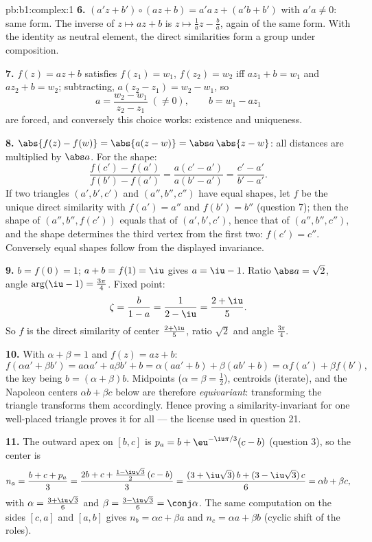 \begin{solution}{pb:b1:complex:1}
\textbf{6.} $(a'z + b') \circ (az + b) = a'a\,z + (a'b + b')$ with
$a'a \neq 0$: same form. The inverse of $z \mapsto az + b$ is $z
\mapsto \frac1a z - \frac ba$, again of the same form. With the
identity  as neutral element, the direct similarities form a
group under composition.

\textbf{7.} $f(z) = az + b$ satisfies $f(z_1) = w_1$, $f(z_2) =
w_2$ iff $a z_1 + b = w_1$ and $a z_2 + b = w_2$; subtracting,
$a(z_2 - z_1) = w_2 - w_1$, so
\[
a = \frac{w_2 - w_1}{z_2 - z_1} \;(\neq 0), \qquad
b = w_1 - a z_1
\]
are forced, and conversely this choice works: existence and
uniqueness.

\textbf{8.} $\abs{f(z) - f(w)} = \abs{a(z - w)} = \abs a\,\abs{z -
w}$: all distances are multiplied by $\abs a$. For the shape:
\[
\frac{f(c') - f(a')}{f(b') - f(a')} = \frac{a(c' -
a')}{a(b' - a')} = \frac{c' - a'}{b' - a'} .
\]
If two triangles $(a', b', c')$ and $(a'', b'', c'')$ have equal
shapes, let $f$ be the unique direct similarity with $f(a') = a''$
and $f(b') = b''$ (question 7); then the shape of $(a'', b'',
f(c'))$ equals that of $(a', b', c')$, hence that of $(a'', b'',
c'')$, and the shape determines the third vertex from the first
two: $f(c') = c''$. Conversely equal shapes follow from the
displayed invariance.

\textbf{9.} $b = f(0) = 1$; $a + b = f(1) = \iu$ gives $a = \iu -
1$. Ratio $\abs a = \sqrt2$, angle $\arg(\iu - 1) =
\frac{3\pi}4$. Fixed point:
\[
\zeta = \frac{b}{1 - a} = \frac1{2 - \iu} = \frac{2 + \iu}5 .
\]
So $f$ is the direct similarity of center $\frac{2+\iu}5$, ratio
$\sqrt2$ and angle $\frac{3\pi}4$.

\textbf{10.} With $\alpha + \beta = 1$ and $f(z) = az + b$:
\[
f(\alpha a' + \beta b') = a\alpha a' + a\beta b' + b
= \alpha(a a' + b) + \beta(a b' + b)
= \alpha f(a') + \beta f(b') ,
\]
the key being $b = (\alpha + \beta)b$. Midpoints ($\alpha = \beta =
\frac12$), centroids (iterate), and the Napoleon centers $\alpha b
+ \beta c$ below are therefore \emph{equivariant}: transforming the
triangle transforms them accordingly. Hence proving a
similarity-invariant  for one well-placed triangle proves
it for all --- the license used in question 21.

\textbf{11.} The outward apex on $[b, c]$ is $p_a = b +
\eu^{-\iu\pi/3}(c - b)$ (question 3), so the center is
\[
n_a = \frac{b + c + p_a}3
= \frac{2b + c + \frac{1 - \iu\sqrt3}2\,(c - b)}3
= \frac{(3 + \iu\sqrt3)\,b + (3 - \iu\sqrt3)\,c}6
= \alpha b + \beta c ,
\]
with $\alpha = \frac{3 + \iu\sqrt3}6$ and $\beta = \frac{3 -
\iu\sqrt3}6 = \conj\alpha$. The same computation on the sides
$[c, a]$ and $[a, b]$ gives $n_b = \alpha c + \beta a$ and $n_c =
\alpha a + \beta b$ (cyclic shift of the roles).


\end{solution}
